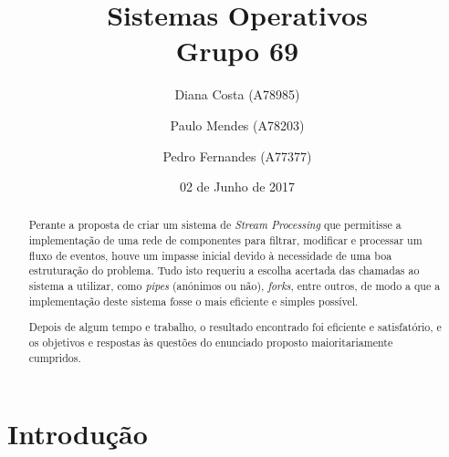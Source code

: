 \documentclass[a4paper]{article}
\title{Sistemas Operativos \\Grupo 69}
\author{Diana Costa (A78985) \and Paulo Mendes (A78203) \and Pedro Fernandes (A77377) }
\date{02 de Junho de 2017}
\begin{document}
\maketitle

\begin{abstract}

\hspace{3mm} Perante a proposta de criar um sistema de \emph{Stream Processing} que permitisse a implementação de uma rede de componentes para filtrar, modificar e processar um fluxo de eventos, houve um impasse inicial devido à necessidade de uma boa estruturação do problema. Tudo isto requeriu a escolha acertada das chamadas ao sistema a utilizar, como \emph{pipes} (anónimos ou não), \emph{forks}, entre outros, de modo a que a implementação deste sistema fosse o mais eficiente e simples possível.

Depois de algum tempo e trabalho, o resultado encontrado foi eficiente e satisfatório, e os objetivos e respostas às questões do enunciado proposto maioritariamente cumpridos.

\end{abstract}

\tableofcontents

\section{Introdução}
\label{sec:1}
\end{document}
